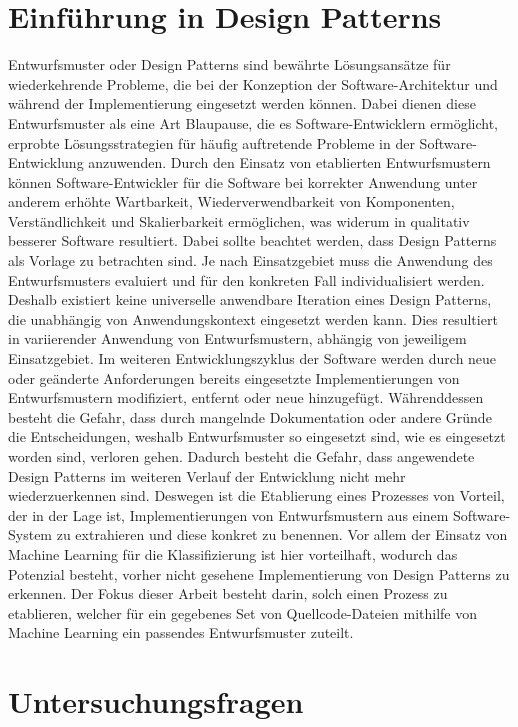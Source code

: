\section{Einführung in Design Patterns}

Entwurfsmuster oder Design Patterns sind bewährte Lösungsansätze für wiederkehrende Probleme, die bei der Konzeption der Software-Architektur und während der Implementierung 
eingesetzt werden können. Dabei dienen diese Entwurfsmuster als eine Art Blaupause, die es Software-Entwicklern ermöglicht, erprobte Lösungsstrategien für häufig auftretende Probleme in der Software-Entwicklung anzuwenden.
Durch den Einsatz von etablierten Entwurfsmustern können Software-Entwickler für die Software bei korrekter Anwendung unter anderem erhöhte Wartbarkeit, Wiederverwendbarkeit von Komponenten, Verständlichkeit und Skalierbarkeit ermöglichen, was widerum in qualitativ besserer Software resultiert.
Dabei sollte beachtet werden, dass Design Patterns als Vorlage zu betrachten sind. Je nach Einsatzgebiet muss die Anwendung des Entwurfsmusters evaluiert und für den konkreten Fall individualisiert werden.
Deshalb existiert keine universelle anwendbare Iteration eines Design Patterns, die unabhängig von Anwendungskontext eingesetzt werden kann. Dies resultiert in variierender Anwendung von Entwurfsmustern, abhängig von jeweiligem Einsatzgebiet.
Im weiteren Entwicklungszyklus der Software werden durch neue oder geänderte Anforderungen bereits eingesetzte Implementierungen von Entwurfsmustern modifiziert, entfernt oder neue hinzugefügt.
Währenddessen besteht die Gefahr, dass durch mangelnde Dokumentation oder andere Gründe die Entscheidungen, weshalb Entwurfsmuster so eingesetzt sind, wie es eingesetzt worden sind, verloren gehen.
Dadurch besteht die Gefahr, dass angewendete Design Patterns im weiteren Verlauf der Entwicklung nicht mehr wiederzuerkennen sind. Deswegen ist die Etablierung eines Prozesses von Vorteil, der in der Lage ist,
Implementierungen von Entwurfsmustern aus einem Software-System zu extrahieren und diese konkret zu benennen. Vor allem der Einsatz von Machine Learning für die Klassifizierung ist hier vorteilhaft, wodurch das Potenzial besteht, vorher nicht gesehene Implementierung von Design Patterns zu erkennen.
Der Fokus dieser Arbeit besteht darin, solch einen Prozess zu etablieren, welcher für ein gegebenes Set von Quellcode-Dateien mithilfe von Machine Learning ein passendes Entwurfsmuster zuteilt. 

\pagebreak

\section{Untersuchungsfragen}


